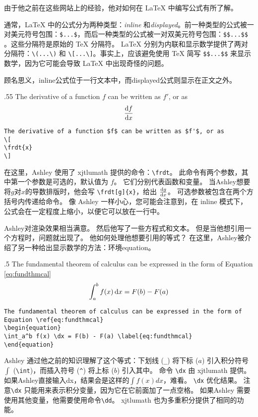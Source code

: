 由于他之前在这些网站上的经验，他对如何在 \LaTeX{} 中编写公式有所了解。

通常，\LaTeX{} 中的公式分为两种类型：\emph{inline} 和\emph{displayed}。前一种类型的公式被一对美元符号包围：\verb=$...$=，而后一种类型的公式被一对双美元符号包围：\verb=$$...$$ =。这些分隔符是原始的 \TeX{} 分隔符。 \LaTeX{} 分别为内联和显示数学提供了两对分隔符：\verb=\(...\)= 和 \verb=\[...\]=。事实上，应该避免使用 \TeX{} 简写 \verb=$$...$$= 来显示数学，因为它可能会导致 \LaTeX{} 中出现奇怪的问题。

顾名思义，inline公式位于一行文本中，而displayed公式则显示在正文之外。

\begin{miniexammar}{.55\textandmarginlen}%
{
The derivative of a function $f$ can be written as $f'$, or as
\[
\frdt{x}
\]
}
\begin{lstlisting}
The derivative of a function $f$ can be written as $f'$, or as
\[
\frdt{x}
\]
\end{lstlisting}
\end{miniexammar}
在这里，Ashley 使用了 xjtlumath 提供的命令：\verb=\frdt=。 此命令有两个参数，其中第一个参数是可选的，默认值为 $f$。 它们分别代表函数和变量。 当Ashley想要将$g$对$x$的导数排版时，他会写
\verb=\frdt[g]{x}=，给出 $\frdt[g]{x}$。 可选参数被包含在两个方括号内传递给命令。 像 Ashley 一样小心，您可能会注意到，在 inline 模式下，公式会在一定程度上缩小，以便它可以放在一行中。

Ashley对渲染效果相当满意。 然后他写了一些方程式和文本。 但是当他想引用一个方程时，问题就出现了。 他如何处理他想要引用的等式？ 在这里，Ashley被介绍了另一种给出显示数学的方法：环境equation。

\begin{miniexammar}{.5\textandmarginlen}%
{
The fundamental theorem of calculus can be expressed in the form of Equation \ref{eq:fundthmcal}
\begin{equation}
\int_a^b f(x) \dx = F(b) - F(a) \label{eq:fundthmcal}
\end{equation}
}
\begin{lstlisting}
The fundamental theorem of calculus can be expressed in the form of Equation \ref{eq:fundthmcal}
\begin{equation}
\int_a^b f(x) \dx = F(b) - F(a) \label{eq:fundthmcal}
\end{equation}
\end{lstlisting}
\end{miniexammar}

Ashley 通过他之前的知识理解了这个等式：下划线 (\verb=_=) 将下标 ($a$) 引入积分符号 $\int$ (\verb=\int=)，而插入符号 (\verb=^=) 将上标 ($b$) 引入其中。 命令 \verb=\dx= 由 xjtlumath 提供。 如果Ashley直接输入dx，结果会是这样的$\int f(x) dx$，难看。 \verb=\dx= 优化结果。 注意\verb=\dx= 只能用来表示积分变量，因为它在它前面加了一点空格。 如果Ashley 需要使用其他变量，他需要使用命令\verb=\dd=。 xjtlumath 也为多重积分提供了相同的功能。

